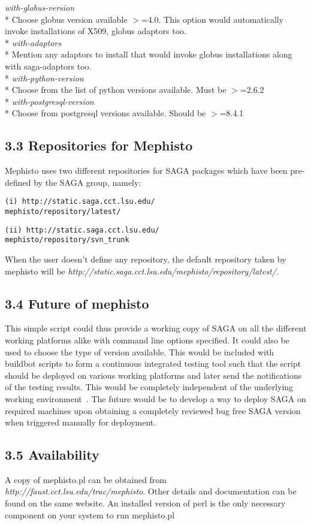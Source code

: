 \documentclass[a4paper,10pt]{article}
\begin{document}
\begin{multicols}{2}
\emph{with-globus-version} \\*
 Choose globus version available $>$=4.0. This option would automatically 
 invoke installations of X509, globus adaptors too. \\*
\emph{with-adaptors}\\*
 Mention any adaptors to install that would invoke globus installations along with 
 saga-adaptors too. \\*
 \emph{with-python-version}\\*
 Choose from the list of python versions available. Must be 
 $>$=2.6.2 \\*
 \emph{with-postgresql-version}\\*
 Choose from postgresql versions available. Should be $>$=8.4.1
 
\subsection*{\normalsize 3.3 Repositories for Mephisto} 
Mephisto uses two different repositories for SAGA packages which have been
pre-defined by the SAGA group, namely: 
\begin{verbatim}
(i) http://static.saga.cct.lsu.edu/
mephisto/repository/latest/
\end{verbatim}
\begin{verbatim}
(ii) http://static.saga.cct.lsu.edu/
mephisto/repository/svn_trunk
\end{verbatim}
When the user doesn't define any repository, the default 
repository taken by mephisto will be 
\emph {http://static.saga.cct.lsu.edu/mephisto/repository/latest/}. 
\subsection*{\normalsize 3.4 Future of mephisto}
This simple script could thus provide a working copy of SAGA on all the different working platforms alike 
with command line options specified. It could also be used to choose the type of version available. This would 
be included with buildbot scripts to form a continuous integrated testing tool such that the script should be
deployed on various working platforms and later send the notifications of the testing results. This would be completely
independent of the underlying working environment~\cite{wiki-ci}. The future would be to develop a way to deploy SAGA 
on required machines upon obtaining a completely reviewed bug free SAGA version when triggered manually for deployment.
\subsection*{\normalsize 3.5 Availability}
A copy of mephisto.pl can be obtained from \emph{http://faust.cct.lsu.edu/trac/mephisto}. Other details and documentation 
can be found on the same website. An installed version of perl is the only necessary component on your system to run mephisto.pl

\end{multicols}
\end{document}

